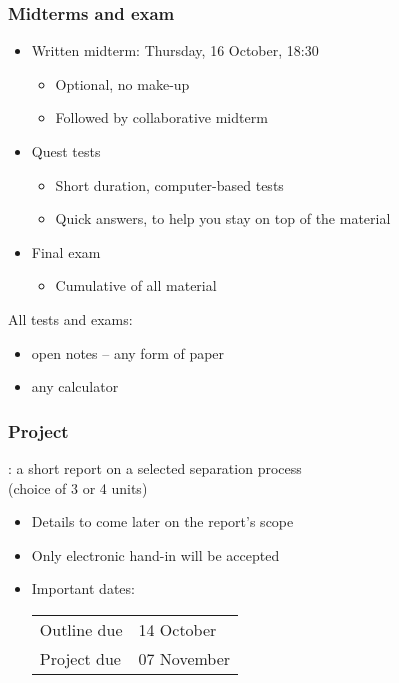\begin{frame}\frametitle{Midterms and exam}
	\begin{itemize}
		\item	Written midterm: Thursday, 16 October, 18:30
		\begin{itemize}
			\item	Optional, no make-up
			\item	Followed by collaborative midterm
		\end{itemize}

		\item	Quest tests
		\begin{itemize}
			\item	Short duration, computer-based tests
			\item	Quick answers, to help you stay on top of the material
		\end{itemize}

		\item	Final exam
		\begin{itemize}
			\item	Cumulative of all material
		\end{itemize}
	\end{itemize}

	\vspace{12pt}
	All tests and exams:
	\begin{itemize}
		\item	open notes -- any form of paper
		\item	any calculator
	\end{itemize}
\end{frame}

\begin{frame}\frametitle{Project}
	\begin{exampleblock}{}
		\textbf{{\color{myBlue}{AIM}}}: a short report on a selected separation process \\(choice of 3 or 4 units)
	\end{exampleblock}
	\begin{itemize}
		\item	Details to come later on the report's scope
		\item	Only electronic hand-in will be accepted
		\item	Important dates:

		\vspace{12pt}
		\begin{tabular}{ll}
			Outline due & 14 October\\
			Project due & 07 November\\
		\end{tabular}
	\end{itemize}
\end{frame}

